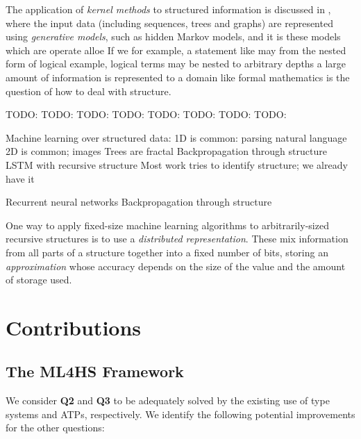 \documentclass[]{article}
\begin{document}
The application of \emph{kernel methods} to structured information is discussed in \cite{Gartner2003}, where the input data (including sequences, trees and graphs) are represented using \emph{generative models}, such as hidden Markov models, and it is these models which are
operate alloe If we for example, a statement like may from the nested form of logical  example, logical terms may be nested to arbitrary depths a large amount of information is represented   to a domain like formal mathematics is the question of how to deal with structure.

TODO: \cite{Gartner2003}
TODO: \cite{Oveisi.Oveisi.Erfanian.ea:2012}
TODO: \cite{bakir2007predicting}
TODO: \cite{conf/ijcai/Plate91}
TODO: \cite{goller1996learning}
TODO: \cite{kwasny1995tail}
TODO: \cite{pollack1990recursive}
TODO: \cite{zanzotto2012distributed}

Machine learning over structured data:
1D is common: parsing natural language
2D is common; images
Trees are fractal
Backpropagation through structure
LSTM with recursive structure
Most work tries to identify structure; we already have it

Recurrent neural networks
Backpropagation through structure

One way to apply fixed-size machine learning algorithms to arbitrarily-sized recursive structures is to use a \emph{distributed representation}. These mix information from all parts of a structure together into a fixed number of bits, storing an \emph{approximation} whose accuracy depends on the size of the value and the amount of storage used.

\section{Contributions}
\label{current}

\subsection{The \textsc{ML4HS} Framework}\label{ml4hs}

We consider \textbf{Q2} and \textbf{Q3} to be adequately solved by the existing
use of type systems and ATPs, respectively. We identify the following potential
improvements for the other questions:
\end{document}
